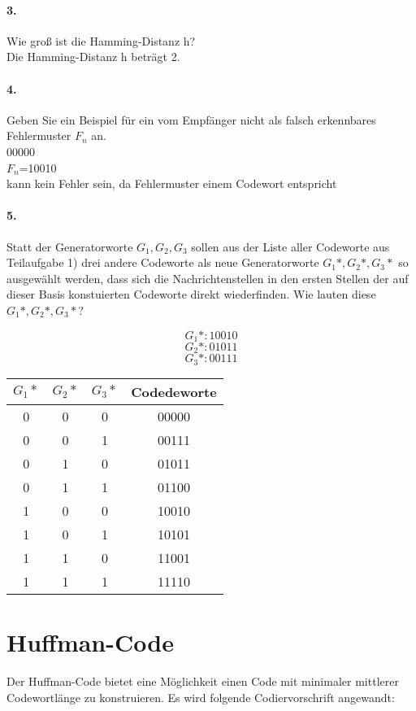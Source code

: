 \documentclass[paper=a4, fontsize=11pt]{scrartcl}
\numberwithin{equation}{section}
\numberwithin{figure}{section}
\numberwithin{table}{section}
\begin{document}
\paragraph{3.}
Wie groß ist die Hamming-Distanz h? \\

Die Hamming-Distanz h beträgt 2.

\paragraph{4.}
Geben Sie ein Beispiel für ein vom Empfänger nicht als falsch erkennbares Fehlermuster $F_{n}$ an. \\

00000 \\
$F_{n}$=10010 \\

kann kein Fehler sein, da Fehlermuster einem Codewort entspricht

\paragraph{5.}
Statt der Generatorworte $G_{1}, G_{2}, G_{3}$ sollen aus der Liste aller Codeworte aus Teilaufgabe 1) drei andere Codeworte als neue Generatorworte $G_{1}*, G_{2}*, G_{3}*$ so ausgewählt werden, dass sich die Nachrichtenstellen in den ersten Stellen der auf dieser Basis konstuierten Codeworte direkt wiederfinden. Wie lauten diese $G_{1}*, G_{2}*, G_{3}*$?

$$G_{1}*: 10010$$
$$G_{2}*: 01011$$
$$G_{3}*: 00111$$

\begin{tabular}{|c|c|c||c|}
\hline
$G_{1}*$ & $G_{2}*$ & $G_{3}*$ & Codedeworte \\
\hline
0 & 0 & 0 & 00000 \\
\hline
0 & 0 & 1 & 00111 \\
\hline
0 & 1 & 0 & 01011 \\
\hline
0 & 1 & 1 & 01100 \\
\hline
1 & 0 & 0 & 10010 \\
\hline
1 & 0 & 1 & 10101 \\
\hline
1 & 1 & 0 & 11001 \\
\hline
1 & 1 & 1 & 11110 \\
\hline
\end{tabular}


\section{Huffman-Code}
Der Huffman-Code bietet eine Möglichkeit einen Code mit minimaler mittlerer Codewortlänge zu konstruieren. Es wird folgende Codiervorschrift angewandt: \\
\end{document}
